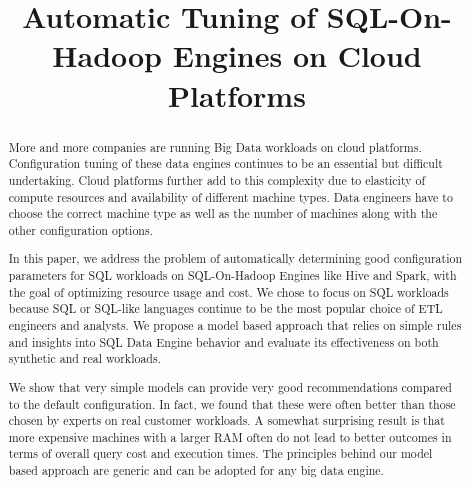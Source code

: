 \documentclass[10pt, conference, compsocconf]{IEEEtran}
\newcommand{\eat}[1]{}
\begin{document}
\title{Automatic Tuning of SQL-On-Hadoop Engines on Cloud Platforms}

\author{
	\and
	\and
}

\maketitle

\begin{abstract}
More and more companies are running Big Data workloads on cloud platforms. Configuration tuning of these data engines continues to be an essential but difficult undertaking. Cloud platforms further add to this complexity due to elasticity of compute resources and availability of different machine types. Data engineers have to choose the correct machine type as well as the number of machines along with the other configuration options.

In this paper, we address the problem of automatically determining good configuration parameters for SQL workloads on SQL-On-Hadoop Engines like Hive and Spark, with the goal of optimizing resource usage and cost. We chose to focus on SQL workloads because SQL or SQL-like languages continue to be the most popular choice of ETL engineers and analysts. We propose a model based approach that relies on simple rules and insights into SQL Data Engine behavior and evaluate its effectiveness on both synthetic and real workloads.

\eat{
We present two alternatives -- an iterative method based on repeatedly executing queries with different configuration parameters and a model based method relying on simple rules and insights. We studied the effectiveness and practical usefulness of these methods on both synthetic and real workloads.
}
We show that very simple models \eat{of SQL Data Engines} can provide very good recommendations compared to the default configuration. In fact, we found that these were often better than those chosen by experts on real customer workloads. A somewhat surprising result is that more expensive machines with a larger RAM often do not lead to better outcomes in terms of overall query cost and execution times. The principles behind our model based approach are generic and can be adopted for any big data engine. 
\end{abstract}

 
 
 
 \eat{}
 
 
 
 

 
\end{document}
